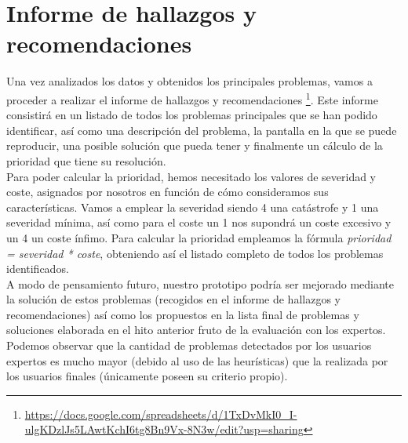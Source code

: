 \section{Informe de hallazgos y recomendaciones}
Una vez analizados los datos y obtenidos los principales problemas, vamos a proceder a realizar el informe de hallazgos y recomendaciones \footnote{\url{https://docs.google.com/spreadsheets/d/1TxDvMkI0_I-ulgKDzlJs5LAwtKchI6tg8Bn9Vx-8N3w/edit?usp=sharing}}. Este informe consistirá
en un listado de todos los problemas principales que se han podido identificar, así como una descripción del problema, la pantalla en la que se puede reproducir,
una posible solución que pueda tener y finalmente un cálculo de la prioridad que tiene su resolución. \\

Para poder calcular la prioridad, hemos necesitado los valores de severidad y coste, asignados por nosotros en función de cómo consideramos sus características. Vamos
a emplear la severidad siendo 4 una catástrofe y 1 una severidad mínima, así como para el coste un 1 nos supondrá un coste excesivo y un 4 un coste ínfimo. Para calcular
la prioridad empleamos la fórmula \textit{prioridad = severidad * coste}, obteniendo así el listado completo de todos los problemas identificados. \\

A modo de pensamiento futuro, nuestro prototipo podría ser mejorado mediante la solución de estos problemas (recogidos en el informe de hallazgos y recomendaciones) así
como los propuestos en la lista final de problemas y soluciones elaborada en el hito anterior fruto de la evaluación con los expertos. Podemos observar que la cantidad de
problemas detectados por los usuarios expertos es mucho mayor (debido al uso de las heurísticas) que la realizada por los usuarios finales (únicamente poseen su criterio propio).


